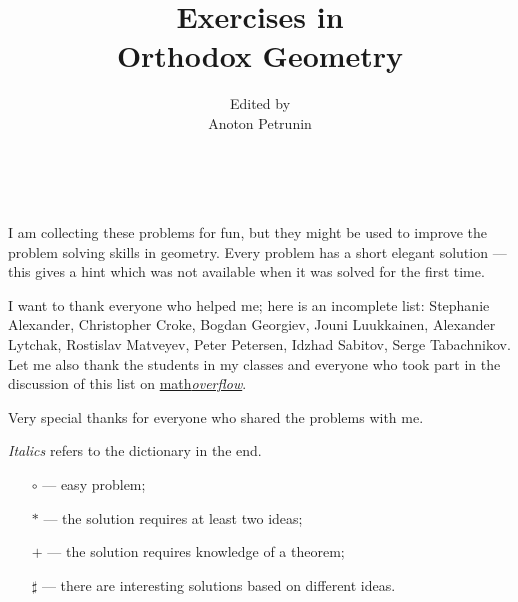 \documentclass[twoside]{book}
\begin{document}
\title{Exercises in \\
Orthodox Geometry}
\author{Edited by\\
 Anoton Petrunin}

\date{}
\maketitle



\null\vfill{}

\ 

\thispagestyle{empty}

\tableofcontents

\newpage

I am collecting these problems for fun, 
but they might be used to improve 
the problem solving skills in geometry.
Every problem has a short elegant solution ---
this gives a hint which was not available
when it was solved for the first time.


I want to thank everyone who helped me;
here is an incomplete list:
Stephanie Alexander,
Christopher Croke,
Bogdan Georgiev,
Jouni Luukkainen,
Alexander Lytchak,
Rostislav Matve\-yev, 
Peter Petersen, 
Idzhad Sabitov,
Serge Tabachnikov.
Let me also thank  the students in my classes 
and everyone who took part in the discussion of this list 
on \href{http://mathoverflow.net/questions/8247}{math\textit{overflow}}.

Very special thanks for everyone who shared the problems with me.

\vfill

\emph{Italics} refers to the dictionary in the end.  
\begin{itemize}
\item[$\circ$] --- easy problem;%
\item[$*$] --- the solution requires at least two ideas;%
\item[{\small$+$}] --- the solution requires knowledge of a theorem;%
\item[$\sharp$] --- there are interesting solutions based on different ideas.%
\end{itemize}
\end{document}
